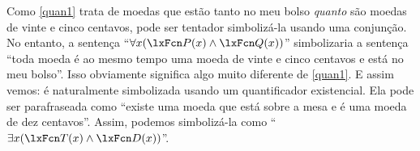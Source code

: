 Como \cref*{quan1} trata de moedas que estão tanto no meu bolso \emph{quanto} são moedas de vinte e cinco centavos, pode ser tentador simbolizá-la usando uma conjunção. No entanto, a sentença \textquotedblleft $\forall x(\atom{P}{x} \eand \atom{Q}{x})$\textquotedblright{} simbolizaria a sentença \textquotedblleft toda moeda é ao mesmo tempo uma moeda de vinte e cinco centavos e está no meu bolso\textquotedblright{}. Isso obviamente significa algo muito diferente de \cref*{quan1}. E assim vemos:
 é naturalmente simbolizada usando um quantificador existencial. Ela pode ser parafraseada como \textquotedblleft existe uma moeda que está sobre a mesa e é uma moeda de dez centavos\textquotedblright{}. Assim, podemos simbolizá-la como \textquotedblleft $\exists x(\atom{T}{x} \eand \atom{D}{x})$\textquotedblright{}.

